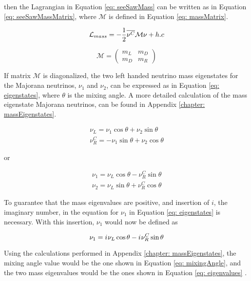 then the Lagrangian in Equation \ref{eq: seeSawMass} can be written as in Equation \ref{eq: seeSawMassMatrix}, where $\mathcal{M}$ is defined in Equation \ref{eq: massMatrix}.

\begin{equation}\label{eq: seeSawMassMatrix}
\mathcal{L}_{mass} = -\frac{1}{2}\overline{\nu^{C}}\mathcal{M}\nu + h.c
\end{equation}

\begin{equation}\label{eq: massMatrix}
\mathcal{M} = \begin{pmatrix} m_{L}&m_{D}\\m_{D}&m_{R} \end{pmatrix}
\end{equation}

If matrix $\mathcal{M}$ is diagonalized, the two left handed neutrino mass eigenstates for the Majorana neutrinos, $\nu_{1}$ and $\nu_{2}$, can be expressed as in Equation \ref{eq: eigenstates}, where $\theta$ is the mixing angle. A more detailed calculation of the mass eigenstate Majorana neutrinos, can be found in Appendix \ref{chapter: massEigenstates}.

\begin{equation*}
\begin{split}
\nu_{L} = \nu_{1} \cos \theta + \nu_{2} \sin \theta \\
\nu_{R}^{C} = -\nu_{1} \sin \theta + \nu_{2} \cos \theta
\end{split}
\end{equation*}


or

\begin{equation} \label{eq: eigenstates}
\begin{split}										
\nu_{1} = \nu_{L} \cos \theta - \nu_{R}^{C} \sin \theta \\
\nu_{2} = \nu_{L} \sin \theta + \nu_{R}^{C} \cos \theta											
\end{split}
\end{equation}

To guarantee that the mass eigenvalues are positive, and insertion of $i$, the imaginary number, in the equation for $\nu_{1}$ in Equation \ref{eq: eigenstates} is necessary. With this insertion, $\nu_{1}$ would now be defined as

$$ \nu_{1} = {i\mkern1mu} \nu_{L} \cos \theta - {i\mkern1mu} \nu_{R}^{C} \sin \theta $$

Using the calculations performed in Appendix \ref{chapter: massEigenstates}, the mixing angle value would be the one shown in Equation \ref{eq: mixingAngle}, and the two mass eigenvalues would be the ones shown in Equation \ref{eq: eigenvalues} \cite{NeutrinoMass}.

